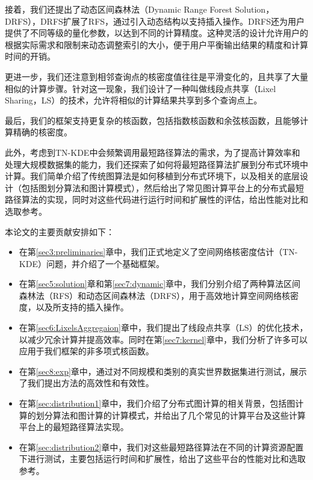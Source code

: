 接着，我们还提出了动态区间森林法（Dynamic Range Forest Solution，DRFS），DRFS扩展了RFS，通过引入动态结构以支持插入操作。DRFS还为用户提供了不同等级的量化参数，以达到不同的计算精度。这种灵活的设计允许用户的根据实际需求和限制来动态调整索引的大小，便于用户平衡输出结果的精度和计算时间的开销。

更进一步，我们还注意到相邻查询点的核密度值往往是平滑变化的，且共享了大量相似的计算步骤。针对这一现象，我们设计了一种叫做线段点共享（Lixel Sharing，LS）的技术，允许将相似的计算结果共享到多个查询点上。

最后，我们的框架支持更复杂的核函数，包括指数核函数和余弦核函数，且能够计算精确的核密度。

此外，考虑到TN-KDE中会频繁调用最短路径算法的需求，为了提高计算效率和处理大规模数据集的能力，我们还探索了如何将最短路径算法扩展到分布式环境中计算。我们简单介绍了传统图算法是如何移植到分布式环境下，以及相关的底层设计（包括图划分算法和图计算模式），然后给出了常见图计算平台上的分布式最短路径算法的实现，同时对这些代码进行运行时间和扩展性的评估，给出性能对比和选取参考。

本论文的主要贡献安排如下：

\begin{itemize}[leftmargin=*]
	\item 在第\ref{sec3:preliminaries}章中，我们正式地定义了空间网络核密度估计（TN-KDE）问题，并介绍了一个基础框架。
	
	\item 在第\ref{sec5:solution}章和第\ref{sec7:dynamic}章中，我们分别介绍了两种算法区间森林法（RFS）和动态区间森林法（DRFS），用于高效地计算空间网络核密度，以及所支持的插入操作。
	
	\item 在第\ref{sec6:LixelsAggregaion}章中，我们提出了线段点共享（LS）的优化技术，以减少冗余计算并提高效率。同时在第\ref{sec7:kernel}章中，我们分析了许多可以应用于我们框架的非多项式核函数。
	
	\item 在第\ref{sec8:exp}章中，通过对不同规模和类别的真实世界数据集进行测试，展示了我们提出方法的高效性和有效性。
	
	\item 在第\ref{sec:distribution1}章中，我们介绍了分布式图计算的相关背景，包括图计算的划分算法和图计算的计算模式，并给出了几个常见的计算平台及这些计算平台上的最短路径算法实现。
	
	\item 在第\ref{sec:distribution2}章中，我们对这些最短路径算法在不同的计算资源配置下进行测试，主要包括运行时间和扩展性，给出了这些平台的性能对比和选取参考。
\end{itemize}
